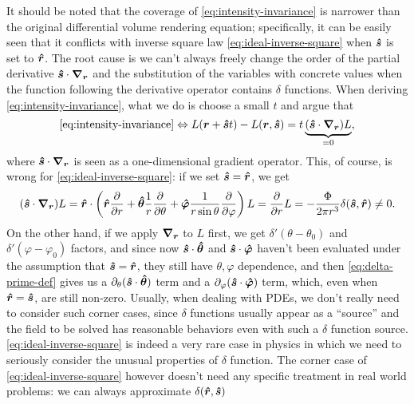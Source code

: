 \documentclass[hyperref, a4paper]{article}
\begin{document}
It should be noted that the coverage of \eqref{eq:intensity-invariance}
is narrower than the original differential volume rendering equation; 
specifically, it can be easily seen that it conflicts with inverse square law
\eqref{eq:ideal-inverse-square}
when $\vu*{s}$ is set to $\vu*{r}$.
The root cause is we can't always freely change 
the order of the partial derivative $\vu*{s} \cdot \grad_{\vb*{r}}$
and the substitution of the variables with concrete values
when the function following the derivative operator 
contains $\delta$ functions.
When deriving \eqref{eq:intensity-invariance},
what we do is choose a small $t$ and argue that 
\begin{equation}
    \eqref{eq:intensity-invariance} \Leftrightarrow
    L(\vb*{r} + \vu*{s} t) - L(\vb*{r}, \vu*{s}) = t \underbrace{(\vu*{s} \cdot \grad_{\vb*{r}}) L}_{=0},
\end{equation} 
where $\vu*{s} \cdot \grad_{\vb*{r}}$ 
is seen as a one-dimensional gradient operator.
This, of course, is wrong for \eqref{eq:ideal-inverse-square}: 
if we set $\vu*{s} = \vu*{r}$, we get 
\begin{equation}
    (\vu*{s} \cdot \grad_{\vb*{r}}) L = \vu*{r} \cdot \left(
        \vu*{r} \pdv{r} + \vu*{\theta} \frac{1}{r} \pdv{\theta} 
    + \vu*{\varphi} \frac{1}{r \sin \theta} \pdv{\varphi}
    \right) L = \pdv{r} L = - \frac{\Phi}{2 \pi r^3} \delta(\vu*{s}, \vu*{r}) \neq 0.
\end{equation}
On the other hand, if we apply $\grad_{\vb*{r}}$ to $L$ first, 
we get $\delta'(\theta - \theta_0)$ and $\delta'(\varphi - \varphi_0)$ factors,
and since now $\vu*{s} \cdot \vu*{\theta}$ and $\vu*{s} \cdot \vu*{\varphi}$
haven't been evaluated under the assumption that $\vu*{s} = \vu*{r}$, 
they still have $\theta, \varphi$ dependence, 
and then \eqref{eq:delta-prime-def} 
gives us a $\partial_\theta (\vu*{s} \cdot \vu*{\theta})$ term 
and a $\partial_\varphi (\vu*{s} \cdot \vu*{\varphi})$ term, 
which, even when $\vu*{r} = \vu*{s}$,
are still non-zero.
Usually, when dealing with PDEs, 
we don't really need to consider such corner cases, 
since $\delta$ functions usually appear as a ``source'' 
and the field to be solved has reasonable behaviors 
even with such a $\delta$ function source. 
\eqref{eq:ideal-inverse-square} is indeed a very rare case 
in physics in which we need to seriously consider 
the unusual properties of $\delta$ function. 
The corner case of \eqref{eq:ideal-inverse-square} however 
doesn't need any specific treatment in real world problems: 
we can always approximate $\delta(\vu*{r}, \vu*{s})$ 
\end{document}
